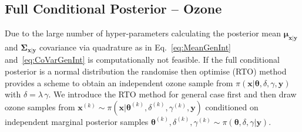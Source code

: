 \subsection{Full Conditional Posterior -- Ozone}
Due to the large number of hyper-parameters calculating the posterior mean $\bm{\mu}_{\bm{x}|\bm{y}}$ and $\bm{\Sigma}_{\bm{x}|\bm{y}}$ covariance via quadrature as in Eq.~\ref{eq:MeanGenInt} and~\ref{eq:CoVarGenInt} is computationally not feasible.
If the full conditional posterior is a normal distribution the randomise then optimise (RTO) method provides a scheme to obtain an independent ozone sample from $\pi(\bm{x}|\bm{\theta}, \delta, \gamma, \bm{y})$ with $\delta = \lambda \, \gamma$.
We introduce the RTO method for general case first and then draw ozone samples from $\bm{x}^{(k)} \sim \pi(\bm{x}|\bm{\theta}^{(k)} , \delta^{(k)} , \gamma^{(k)} , \bm{y})$ conditioned on independent marginal posterior samples $\bm{\theta}^{(k)} , \delta^{(k)} , \gamma^{(k)} \sim \pi(\bm{\theta} , \delta , \gamma | \bm{y})$.



